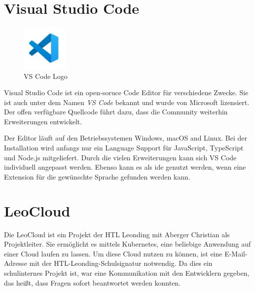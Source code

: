 \section{Visual Studio Code}
\begin{figure}
  \begin{center}
      \includegraphics[width=0.2\textwidth]{pics/logos/vscode.jpg}
      \caption{VS Code Logo}
  \end{center}
\end{figure}
Visual Studio Code ist ein open-soruce Code Editor für verschiedene Zwecke. 
Sie ist auch unter dem Namen \emph{VS Code} bekannt und wurde von Microsoft lizensiert. 
Der offen verfügbare Quellcode führt dazu, dass die Community weiterhin Erweiterungen entwickelt.
\cite{vscodeAbout}

Der Editor läuft auf den Betriebssystemen Windows, macOS and Linux. 
Bei der Installation wird anfangs nur ein Language Support für JavaScript, TypeScript und Node.js mitgeliefert. 
Durch die vielen Erweiterungen kann sich VS Code individuell angepasst werden. 
Ebenso kann es als \gls{ide} genutzt werden, wenn eine Extension für die gewünschte Sprache gefunden werden kann. 
\cite{vscodeAboutGs}

\section{LeoCloud}
Die LeoCloud ist ein Projekt der HTL Leonding mit Aberger Christian als Projektleiter. 
Sie ermöglicht es mittels Kubernetes, eine beliebige Anwendung auf einer Cloud laufen zu lassen. 
Um diese Cloud nutzen zu können, ist eine E-Mail-Adresse mit der HTL-Leonding-Schulsignatur notwendig. 
Da dies ein schulinternes Projekt ist, war eine Kommunikation mit den Entwicklern gegeben, das heißt, dass Fragen sofort beantwortet werden konnten. 
\cite{LeoCloudAbout}

